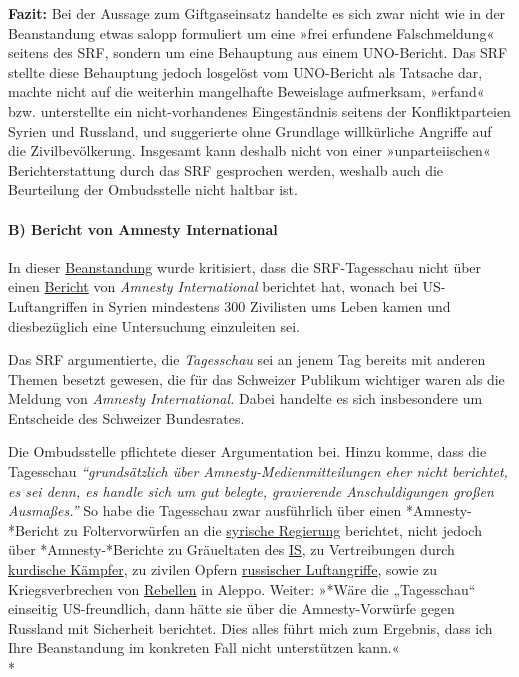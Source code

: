 \textbf{Fazit:} Bei der Aussage zum Giftgaseinsatz handelte es sich zwar
nicht wie in der Beanstandung etwas salopp formuliert um eine »frei
erfundene Falschmeldung« seitens des SRF, sondern um eine Behauptung aus
einem UNO-Bericht. Das SRF stellte diese Behauptung jedoch losgelöst vom
UNO-Bericht als Tatsache dar, machte nicht auf die weiterhin mangelhafte
Beweislage aufmerksam, »erfand« bzw. unterstellte ein nicht-vorhandenes
Eingeständnis seitens der Konfliktparteien Syrien und Russland, und
suggerierte ohne Grundlage willkürliche Angriffe auf die
Zivilbevölkerung. Insgesamt kann deshalb nicht von einer
»unparteiischen« Berichterstattung durch das SRF gesprochen werden,
weshalb auch die Beurteilung der Ombudsstelle nicht haltbar ist.

\hypertarget{b-bericht-von-amnesty-international}{%
\paragraph{B) Bericht von Amnesty
International}\label{b-bericht-von-amnesty-international}}

In dieser
\href{https://www.srgd.ch/de/aktuelles/news/2016/11/17/tagesschau-beitrag-uber-ein-memorandum-von-amnesty-international-beanstandet/}{Beanstandung}
wurde kritisiert, dass die SRF-Tagesschau nicht über einen
\href{https://www.amnesty.ch/de/laender/naher-osten-nordafrika/syrien/dok/2016/zivile-opfer-luftangriffe-us-koalition-syrien}{Bericht}
von \emph{Amnesty International} berichtet hat, wonach bei
US-Luftangriffen in Syrien mindestens 300 Zivilisten ums Leben kamen und
diesbezüglich eine Untersuchung einzuleiten sei.

Das SRF argumentierte, die \emph{Tagesschau} sei an jenem Tag bereits
mit anderen Themen besetzt gewesen, die für das Schweizer Publikum
wichtiger waren als die Meldung von \emph{Amnesty International.} Dabei
handelte es sich insbesondere um Entscheide des Schweizer Bundesrates.

Die Ombudsstelle pflichtete dieser Argumentation bei. Hinzu komme, dass
die Tagesschau \emph{``grundsätzlich über Amnesty-Medienmitteilungen
eher nicht berichtet, es sei denn, es handle sich um gut belegte,
gravierende Anschuldigungen großen Ausmaßes.''} So habe die Tagesschau
zwar ausführlich über einen *Amnesty-*Bericht zu Foltervorwürfen an die
\href{https://www.amnesty.org/en/documents/mde24/4508/2016/en/}{syrische
Regierung} berichtet, nicht jedoch über *Amnesty-*Berichte zu
Gräueltaten des
\href{https://www.amnesty.org/en/latest/news/2014/09/gruesome-evidence-ethnic-cleansing-northern-iraq-islamic-state-moves-wipe-out-minorities/}{IS},
zu Vertreibungen durch
\href{https://www.amnesty.org/en/documents/mde24/2503/2015/en/}{kurdische
Kämpfer}, zu zivilen Opfern
\href{https://www.amnesty.org/en/documents/mde24/3113/2015/en/}{russischer
Luftangriffe}, sowie zu Kriegsverbrechen von
\href{https://www.amnesty.org/en/latest/news/2016/05/syria-armed-opposition-groups-committing-war-crimes-in-aleppo-city/}{Rebellen}
in Aleppo. Weiter: »*Wäre die „Tagesschau`` einseitig US-freundlich,
dann hätte sie über die Amnesty-Vorwürfe gegen Russland mit Sicherheit
berichtet. Dies alles führt mich zum Ergebnis, dass ich Ihre
Beanstandung im konkreten Fall nicht unterstützen kann.«\\
*

